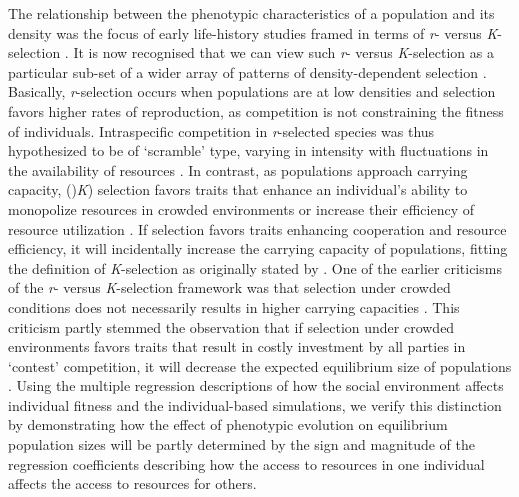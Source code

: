 \documentclass{article}
\begin{document}
The relationship between the phenotypic characteristics of a population and its density was the focus of early life-history studies framed in terms of \textit{r}- versus \textit{K}-selection \citep{macarthur1967theory}. It is now recognised that we can view such \textit{r}- versus \textit{K}-selection as a particular sub-set of a wider array of patterns of density-dependent selection \citep{Boyce1984, Wright2018, Engen2020}. Basically, \textit{r}-selection occurs when populations are at low densities and selection favors higher rates of reproduction, as competition is not constraining the fitness of individuals. Intraspecific competition in \textit{r}-selected species was thus hypothesized to be of `scramble' type, varying in intensity with fluctuations in the availability of resources \citep{Southwood1977}. In contrast, as populations approach carrying capacity, ()\textit{K}) selection favors traits that enhance an individual's ability to monopolize resources in crowded environments or increase their efficiency of resource utilization \citep{Boyce1984}. If selection favors traits enhancing cooperation and resource efficiency, it will incidentally increase the carrying capacity of populations, fitting the definition of \textit{K}-selection as originally stated by \cite{macarthur1967theory}. One of the earlier criticisms of the \textit{r}- versus \textit{K}-selection framework was that selection under crowded conditions does not necessarily results in higher carrying capacities \citep{Boyce1984}. This criticism partly stemmed the observation that if selection under crowded environments favors traits that result in costly investment by all parties in `contest' competition, it will decrease the expected equilibrium size of populations \citep{Joshi2001, Engen2020}. Using the multiple regression descriptions of how the social environment affects individual fitness and the individual-based simulations, we verify this distinction by demonstrating how the effect of phenotypic evolution on equilibrium population sizes will be partly determined by the sign and magnitude of the regression coefficients describing how the access to resources in one individual affects the access to resources for others.
\end{document}

